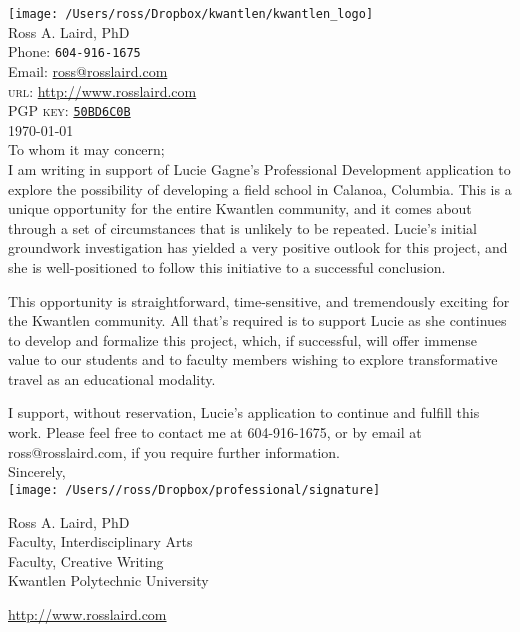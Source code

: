 \documentclass[10pt, letterpaper]{article}
\begin{document}
    \thispagestyle{empty}
    \reversemarginpar
    \noindent
    \texttt{[image: /Users/ross/Dropbox/kwantlen/kwantlen\_logo]}\\[2em]
    {\LARGE Ross A. Laird, PhD}\\[2em]
    Phone: \texttt{604-916-1675}\\
    Email: \href{mailto:ross@rosslaird.com}{ross@rosslaird.com}\\
    \textsc{url}: \href{http://www.rosslaird.com}{http://www.rosslaird.com}\\
    \textsc{PGP key}: \href{http://keyserver.ubuntu.com:11371/pks/lookup?op=get&search=0x623D9CC650BD6C0B}{\texttt{50BD6C0B}}
    \\[2em]
    \today\\[2em]
    To whom it may concern;\\

I am writing in support of Lucie Gagne's Professional Development application to explore the possibility of developing a field school in Calanoa, Columbia. This is a unique opportunity for the entire Kwantlen community, and it comes about through a set of circumstances that is unlikely to be repeated. Lucie's initial groundwork investigation has yielded a very positive outlook for this project, and she is well-positioned to follow this initiative to a successful conclusion.

This opportunity is straightforward, time-sensitive, and tremendously exciting for the Kwantlen community. All that's required is to support Lucie as she continues to develop and formalize this project, which, if successful, will offer immense value to our students and to faculty members wishing to explore transformative travel as an educational modality.

I support, without reservation, Lucie's application to continue and fulfill this work. Please feel free to contact me at 604-916-1675, or by email at
ross@rosslaird.com, if you require further information.\\[1em]
\noindent
Sincerely,\\[2em]
    \texttt{[image: /Users//ross/Dropbox/professional/signature]}

\noindent
Ross A. Laird, PhD\\
Faculty, Interdisciplinary Arts\\
Faculty, Creative Writing\\
Kwantlen Polytechnic University



    \vfill{}
    \hrulefill
    \begin{center}
    {\footnotesize \href{http://www.rosslaird.com}{http://www.rosslaird.com}\pmglyph{\Hibw}}
    \end{center}
    
\end{document}
